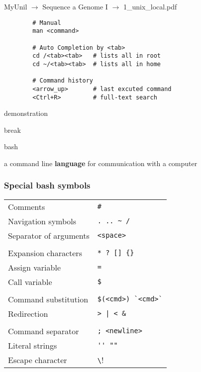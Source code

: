 \documentclass[xcolor=dvipsnames]{beamer}
\begin{document}
\begin{frame}[fragile]
	\begin{center}
		MyUnil $\rightarrow$ Sequence a Genome I $\rightarrow$ 1\_unix\_local.pdf
	\end{center}
	\Large
	\begin{verbatim}
		# Manual
		man <command>

		# Auto Completion by <tab>
		cd /<tab><tab>   # lists all in root
		cd ~/<tab><tab>  # lists all in home

		# Command history
		<arrow_up>       # last excuted command
		<Ctrl+R>         # full-text search
	\end{verbatim}
\end{frame}

\begin{frame}
	\Huge
	\begin{center}
		demonstration
	\end{center}
\end{frame}

\begin{frame}
	\Huge
	\begin{center}
		break
	\end{center}
\end{frame}

\begin{frame}
	\Huge
	\begin{center}
		bash
	\end{center}
	\large
	a command line \huge \textbf{language} \large for communication with a computer
\end{frame}

\begin{frame}[fragile]
	\frametitle{Special bash symbols}
	\large
	\begin{tabular}{L{0.45\textwidth} L{0.5\textwidth}}
	Comments & \verb!#! \\
	Navigation symbols & \verb!. .. ~ /! \\
	Separator of arguments & \verb!<space>! \\
	& \\
	Expansion characters & \verb!* ? [] {}! \\
	Assign variable & \verb!=! \\
	Call variable & \verb!$! \\
	& \\
	Command substitution & \verb!$(<cmd>) `<cmd>`! \\
	Redirection & \verb!> | < &! \\
	& \\
	Command separator & \verb!; <newline>! \\
	Literal strings & \verb!'' ""! \\
	Escape character & \verb!\! \\
	\end{tabular}
\end{frame}
\end{document}
